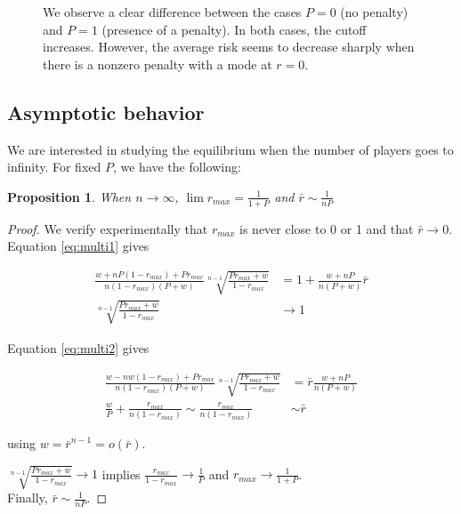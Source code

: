 \documentclass[preprint,12pt,authoryear]{elsarticle}
\newtheorem{proposition}[theorem]{Proposition}
\theoremstyle{definition}
\begin{document}
\begin{figure}[htbp]
  \centering
  \begin{minipage}[t]{0.48\textwidth}
    \centering
    
  \end{minipage}
  \hfill
  \begin{minipage}[t]{0.48\textwidth}
    \centering
    
  \end{minipage}
  \caption{We observe a clear difference between the cases $P=0$ (no penalty) and $P=1$ (presence of a penalty). In both cases, the cutoff increases. However, the average risk seems to decrease sharply when there is a nonzero penalty with a mode at $r=0$.}
  \label{fig:solution-multiple}  
\end{figure}

\subsection{Asymptotic behavior}

We are interested in studying the equilibrium when the number of players goes to infinity. For fixed $P$, we have the following:

\begin{proposition}When $n\rightarrow \infty$,
    $\lim {r_{max}} = \frac{1}{1+P}$ and $\bar r \sim \frac{1}{n P}$
\end{proposition}


\begin{proof}
We verify experimentally that $r_{max}$ is never close to 0 or 1 and that $\bar r \rightarrow 0$.
Equation \ref{eq:multi1} gives

\begin{align*}
    \frac{w + n P (1-{r_{max}}) + P {r_{max}}}{n (1-{r_{max}})(P+w)} \sqrt[n-1]{\frac{P{r_{max}}+w}{1-{r_{max}}}} &= 1 + \frac{w + nP}{n(P+w)} \bar r \\
    \sqrt[n-1]{\frac{P{r_{max}}+w}{1-{r_{max}}}} &\rightarrow 1
\end{align*}

Equation \ref{eq:multi2} gives

\begin{align*}
    \frac{w - nw(1-{r_{max}})+P{r_{max}}}{n(1-{r_{max}})(P+w)} \sqrt[n-1]{\frac{P{r_{max}}+w}{1-{r_{max}}}} &= \bar r \frac{w + nP}{n(P+w)} \\
    \frac{w}{P} + \frac{{r_{max}}}{n(1-{r_{max}})} \sim \frac{{r_{max}}}{n(1-{r_{max}})}  &\sim \bar r
\end{align*}


using $w = \bar r ^{n-1} = o(\bar r)$.

$\sqrt[n-1]{\frac{P{r_{max}}+w}{1-{r_{max}}}} \rightarrow 1$ implies $\frac{{r_{max}}}{1-{r_{max}}} \rightarrow \frac{1}P$ and ${r_{max}} \rightarrow \frac{1}{1+P}$.\\Finally, $\bar r \sim \frac{1}{nP}$.
\end{proof}
\end{document}
